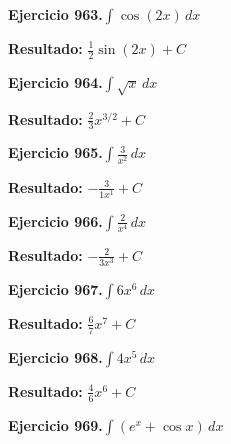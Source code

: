 \documentclass[10pt,a4paper]{article}
\begin{document}
\begin{ejbox}
\textbf{Ejercicio 963.}\quad $\int \cos(2x)\,dx$
\end{ejbox}

\begin{solbox}
\textbf{Resultado:} \(\displaystyle \frac{1}{2}\sin(2x) + C\)
\end{solbox}

\newpage
\begin{ejbox}
\textbf{Ejercicio 964.}\quad $\int \sqrt{x}\,dx$
\end{ejbox}

\begin{solbox}
\textbf{Resultado:} \(\displaystyle \frac{2}{3}x^{3/2} + C\)
\end{solbox}

\begin{ejbox}
\textbf{Ejercicio 965.}\quad $\int \frac{3}{x^{2}}\,dx$
\end{ejbox}

\begin{solbox}
\textbf{Resultado:} \(\displaystyle -\frac{3}{1x^{1}} + C\)
\end{solbox}

\begin{ejbox}
\textbf{Ejercicio 966.}\quad $\int \frac{2}{x^{4}}\,dx$
\end{ejbox}

\begin{solbox}
\textbf{Resultado:} \(\displaystyle -\frac{2}{3x^{3}} + C\)
\end{solbox}

\newpage
\begin{ejbox}
\textbf{Ejercicio 967.}\quad $\int 6x^{6}\,dx$
\end{ejbox}

\begin{solbox}
\textbf{Resultado:} \(\displaystyle \frac{6}{7}x^{7} + C\)
\end{solbox}

\begin{ejbox}
\textbf{Ejercicio 968.}\quad $\int 4x^{5}\,dx$
\end{ejbox}

\begin{solbox}
\textbf{Resultado:} \(\displaystyle \frac{4}{6}x^{6} + C\)
\end{solbox}

\begin{ejbox}
\textbf{Ejercicio 969.}\quad $\int (e^x + \cos x)\,dx$
\end{ejbox}
\end{document}
